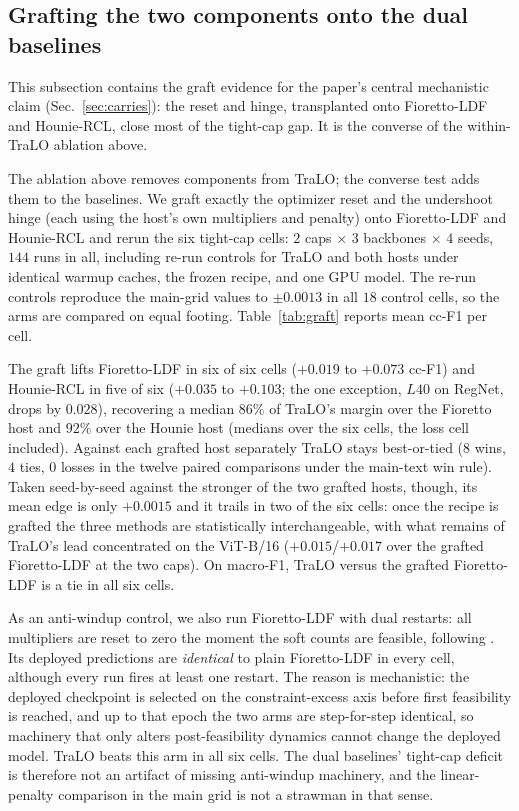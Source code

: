 \documentclass[10pt]{article}
\begin{document}


\subsection{Grafting the two components onto the dual baselines}
\label{app:graft}

This subsection contains the graft evidence for the paper's central
mechanistic claim (Sec.~\ref{sec:carries}): the reset and hinge,
transplanted onto Fioretto-LDF and Hounie-RCL, close most of the
tight-cap gap. It is the converse of the within-TraLO ablation above.

The ablation above removes components from TraLO; the converse test adds
them to the baselines. We graft exactly the optimizer reset and the
undershoot hinge (each using the host's own multipliers and penalty)
onto Fioretto-LDF and Hounie-RCL and rerun the six tight-cap cells:
$2$ caps $\times$ $3$ backbones $\times$ $4$ seeds, $144$ runs in all,
including re-run controls for TraLO and both hosts under identical
warmup caches, the frozen recipe, and one GPU model. The re-run
controls reproduce the main-grid values to $\pm0.0013$ in all $18$
control cells, so the arms are compared on equal footing.
Table~\ref{tab:graft} reports mean cc-F1 per cell.

The graft lifts Fioretto-LDF in six of six cells ($+0.019$ to $+0.073$
cc-F1) and Hounie-RCL in five of six ($+0.035$ to $+0.103$; the one
exception, $L40$ on RegNet, drops by $0.028$), recovering a median
$86\%$ of TraLO's margin over the Fioretto host and $92\%$ over the
Hounie host (medians over the six cells, the loss cell included).
Against each grafted host separately TraLO stays best-or-tied ($8$
wins, $4$ ties, $0$ losses in the twelve paired comparisons under the
main-text win rule). Taken seed-by-seed against the stronger of the two
grafted hosts, though, its mean edge is only $+0.0015$ and it trails in
two of the six cells: once the recipe is grafted the three methods are
statistically interchangeable, with what remains of TraLO's lead
concentrated on the ViT-B/16 ($+0.015$/$+0.017$ over the grafted
Fioretto-LDF at the two caps). On macro-F1, TraLO versus the grafted
Fioretto-LDF is a tie in all six cells.

As an anti-windup control, we also run Fioretto-LDF with dual restarts:
all multipliers are reset to zero the moment the soft counts are
feasible, following \citet{gallego2022controlled}. Its deployed
predictions are \emph{identical} to plain Fioretto-LDF in every cell,
although every run fires at least one restart. The reason is
mechanistic: the deployed checkpoint is selected on the
constraint-excess axis before first feasibility is reached, and up to
that epoch the two arms are step-for-step identical, so machinery that
only alters post-feasibility dynamics cannot change the deployed model.
TraLO beats this arm in all six cells. The dual baselines' tight-cap
deficit is therefore not an artifact of missing anti-windup machinery,
and the linear-penalty comparison in the main grid is not a strawman in
that sense.
\end{document}
